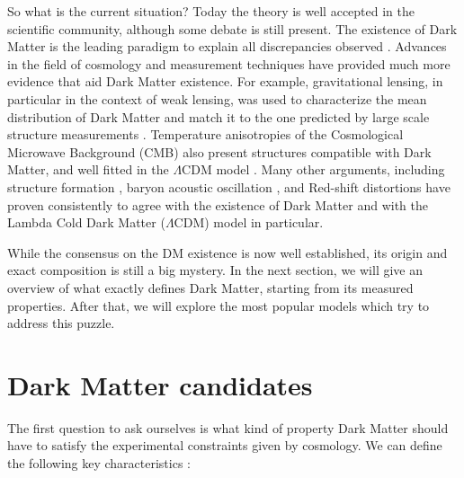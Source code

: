 So what is the current situation? Today the theory is well accepted in the scientific community, although some debate is still present. The existence of Dark Matter is the leading paradigm to explain all discrepancies observed \cite{hooper}. Advances in the field of cosmology and measurement techniques have provided much more evidence that aid Dark Matter existence. For example, gravitational lensing, in particular in the context of weak lensing, was used to characterize the mean distribution of Dark Matter and match it to the one predicted by large scale structure measurements \cite{weak-lensing}. Temperature anisotropies of the Cosmological Microwave Background (CMB) also present structures compatible with Dark Matter, and well fitted in the $\Lambda$CDM model \cite{Ade:2015xua}. Many other arguments, including structure formation \cite{Navarro:1995iw}, baryon acoustic oscillation \cite{bao}, and Red-shift distortions \cite{Peacock2001} have proven consistently to agree with the existence of Dark Matter and with the Lambda Cold Dark Matter ($\Lambda$CDM) model in particular.

While the consensus on the DM  existence is now well established, its origin and exact composition is still a big mystery. In the next section, we will give an overview of what exactly defines Dark Matter, starting from its measured properties. After that, we will explore the most popular models which try to address this puzzle.

\section{Dark Matter candidates}
\label{ch1:sec:dm-candidates}

The first question to ask ourselves is what kind of property Dark Matter should have to satisfy the experimental constraints given by cosmology. We can define the following key characteristics \cite{Profumo:2019ujg}:

